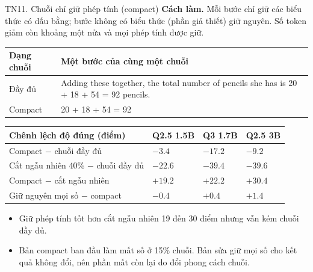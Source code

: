 \documentclass[aspectratio=169,t,10pt]{beamer}
\newcommand{\ex}[1]{{\ttfamily\footnotesize #1}}
\begin{document}
\begin{frame}[shrink]{TN11. Chuỗi chỉ giữ phép tính (compact)}
\small
\textbf{Cách làm.} Mỗi bước chỉ giữ các biểu thức có dấu bằng; bước không có biểu thức (phần giả thiết) giữ nguyên. Số token giảm còn khoảng một nửa và mọi phép tính được giữ.\par
\vspace{2pt}
\footnotesize
\renewcommand{\arraystretch}{1.25}
\begin{tabularx}{\textwidth}{@{}P{2.0cm}Y@{}}
\toprule
\textbf{Dạng chuỗi} & \textbf{Một bước của cùng một chuỗi}\\
\midrule
Đầy đủ & \ex{Adding these together, the total number of pencils she has is 20 + 18 + 54 = 92 pencils.}\\
Compact & \ex{20 + 18 + 54 = 92}\\
\bottomrule
\end{tabularx}
\vspace{4pt}
\renewcommand{\arraystretch}{1.22}
\begin{tabularx}{\textwidth}{@{}YQ{2.1cm}Q{2.1cm}Q{2.1cm}@{}}
\toprule
\textbf{Chênh lệch độ đúng (điểm)} & \textbf{Q2.5 1.5B} & \textbf{Q3 1.7B} & \textbf{Q2.5 3B}\\
\midrule
Compact $-$ chuỗi đầy đủ & $-3.4$ & $-17.2$ & $-9.2$\\
Cắt ngẫu nhiên 40\% $-$ chuỗi đầy đủ & $-22.6$ & $-39.4$ & $-39.6$\\
Compact $-$ cắt ngẫu nhiên & $+19.2$ & $+22.2$ & $+30.4$\\
Giữ nguyên mọi số $-$ compact & $-0.4$ & $+0.4$ & $+1.4$\\
\bottomrule
\end{tabularx}
\small
\begin{itemize}
  \item Giữ phép tính tốt hơn cắt ngẫu nhiên 19 đến 30 điểm nhưng vẫn kém chuỗi đầy đủ.
  \item Bản compact ban đầu làm mất số ở 15\% chuỗi. Bản sửa giữ mọi số cho kết quả không đổi, nên phần mất còn lại do đổi phong cách chuỗi.
\end{itemize}
\end{frame}
\end{document}
